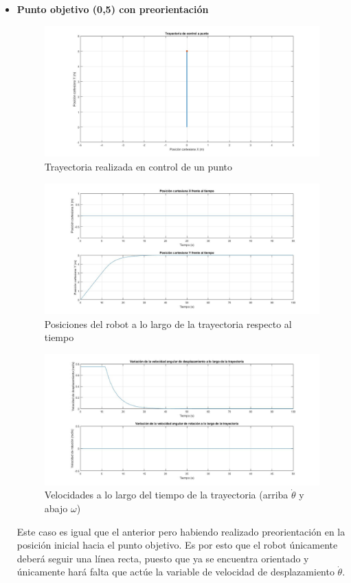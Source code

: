 \documentclass[a4paper,twoside]{article}
\begin{document}
\begin{itemize}
		\item \textbf{Punto objetivo (0,5) con preorientación}
		\begin{figure}[h!]
			\centering
			\includegraphics[width=1\textwidth]{control_punto_2}
			\caption{Trayectoria realizada en control de un punto}
		\end{figure}
		\begin{figure}[h!]
			\centering
			\includegraphics[width=1\textwidth]{control_punto_2_2}
			\caption{Posiciones del robot a lo largo de la trayectoria respecto al tiempo}
		\end{figure}
		\begin{figure}[h!]
			\centering
			\includegraphics[width=1\textwidth]{control_punto_2_3}
			\caption{Velocidades a lo largo del tiempo de la trayectoria (arriba $\dot{\theta}$ y abajo $\omega$)}
		\end{figure}
	
	Este caso es igual que el anterior pero habiendo realizado preorientación en la posición inicial hacia el punto objetivo. Es por esto que el robot únicamente deberá seguir una línea recta, puesto que ya se encuentra orientado y únicamente hará falta que actúe la variable de velocidad de desplazamiento $\dot{\theta}$.
	\end{itemize}
\end{document}
